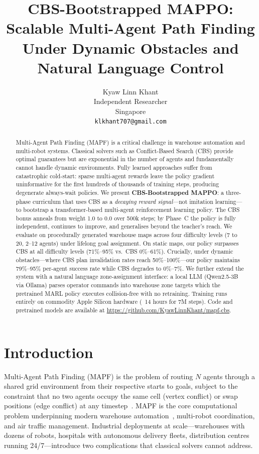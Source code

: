 \documentclass[letterpaper,twocolumn,10pt]{article}
\title{%
  \textbf{CBS-Bootstrapped MAPPO: Scalable Multi-Agent Path Finding\\
  Under Dynamic Obstacles and Natural Language Control}
}
\author{
  Kyaw Linn Khant \\
  Independent Researcher \\
  Singapore \\
  \texttt{klkhant707@gmail.com}
}
\date{}
\begin{document}
\maketitle

\begin{abstract}
Multi-Agent Path Finding (MAPF) is a critical challenge in warehouse automation and
multi-robot systems. Classical solvers such as Conflict-Based Search (CBS) provide
optimal guarantees but are exponential in the number of agents and fundamentally
cannot handle dynamic environments. Fully learned approaches suffer from catastrophic
cold-start: sparse multi-agent rewards leave the policy gradient uninformative for
the first hundreds of thousands of training steps, producing degenerate always-wait
policies. We present \textbf{CBS-Bootstrapped MAPPO}: a three-phase curriculum that
uses CBS as a \emph{decaying reward signal}---not imitation learning---to bootstrap
a transformer-based multi-agent reinforcement learning policy. The CBS bonus anneals
from weight 1.0 to 0.0 over 500k steps; by Phase~C the policy is fully independent,
continues to improve, and generalises beyond the teacher's reach. We evaluate on
procedurally generated warehouse maps across four difficulty levels
(7 to 20, 2--12 agents) under lifelong goal assignment.
On static maps, our policy surpasses CBS at all difficulty levels (71\%--95\% vs.\
CBS 0\%--61\%). Crucially, under dynamic obstacles---where CBS plan invalidation
rates reach 50\%--100\%---our policy maintains 79\%--95\% per-agent success rate
while CBS degrades to 0\%--7\%. We further extend the system with a natural language
zone-assignment interface: a local LLM (Qwen2.5-3B via Ollama) parses operator
commands into warehouse zone targets which the pretrained MARL policy executes
collision-free with no retraining. Training runs entirely on commodity Apple Silicon
hardware (~14 hours for 7M steps). Code and pretrained models are available at
\url{https://github.com/KyawLinnKhant/mapf-cbs}.
\end{abstract}

\section{Introduction}

Multi-Agent Path Finding (MAPF) is the problem of routing $N$ agents through a shared
grid environment from their respective starts to goals, subject to the constraint that
no two agents occupy the same cell (vertex conflict) or swap positions (edge conflict)
at any timestep~\cite{sharon2015cbs}. MAPF is the core computational problem
underpinning modern warehouse automation~\cite{ma2017lifelong}, multi-robot
coordination, and air traffic management. Industrial deployments at scale---warehouses
with dozens of robots, hospitals with autonomous delivery fleets, distribution centres
running 24/7---introduce two complications that classical solvers cannot address.
\end{document}
